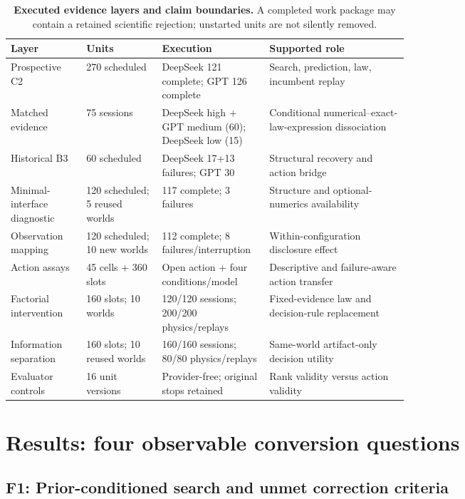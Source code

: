 \documentclass{article}
\begin{document}
\begin{table}[t]
\caption{\textbf{Executed evidence layers and claim boundaries.} A completed work package may contain
a retained scientific rejection; unstarted units are not silently removed.}
\label{tab:evidence}
\centering
\footnotesize
\setlength{\tabcolsep}{4pt}
\begin{tabularx}{\linewidth}{@{}p{0.19\linewidth}p{0.19\linewidth}p{0.27\linewidth}Y@{}}
\toprule
Layer & Units & Execution & Supported role \\
\midrule
Prospective C2 & 270 scheduled & DeepSeek 121 complete; GPT 126 complete & Search, prediction, law, incumbent replay \\
Matched evidence & 75 sessions & DeepSeek high + GPT medium (60); DeepSeek low (15) & Conditional numerical--exact-law-expression dissociation \\
Historical B3 & 60 scheduled & DeepSeek 17+13 failures; GPT 30 & Structural recovery and action bridge \\
Minimal-interface diagnostic & 120 scheduled; 5 reused worlds & 117 complete; 3 failures & Structure and optional-numerics availability \\
Observation mapping & 120 scheduled; 10 new worlds & 112 complete; 8 failures/interruption & Within-configuration disclosure effect \\
Action assays & 45 cells + 360 slots & Open action + four conditions/model & Descriptive and failure-aware action transfer \\
Factorial intervention & 160 slots; 10 worlds & 120/120 sessions; 200/200 physics/replays & Fixed-evidence law and decision-rule replacement \\
Information separation & 160 slots; 10 reused worlds & 160/160 sessions; 80/80 physics/replays & Same-world artifact-only decision utility \\
Evaluator controls & 16 unit versions & Provider-free; original stops retained & Rank validity versus action validity \\
\bottomrule
\end{tabularx}
\end{table}

\section{Results: four observable conversion
questions}\label{results-four-observable-conversion-questions}

\subsection{F1: Prior-conditioned search and unmet correction
criteria}\label{f1-prior-conditioned-search-and-unmet-correction-criteria}
\end{document}
